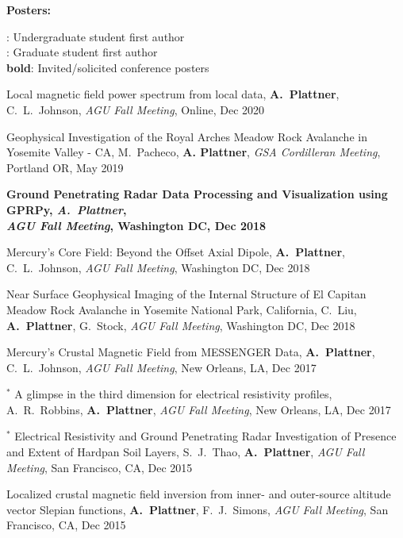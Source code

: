 \documentclass[10pt]{article}
\begin{document}



\spc
\textbf{\tsize Posters:}

\spcp
\ug: Undergraduate student first author\\
\gr: Graduate student first author\\
\textbf{bold}: Invited/solicited conference posters

\spcp
Local magnetic field power spectrum from local data,
\textbf{A.~Plattner}, C.~L.~Johnson, 
\emph{AGU Fall Meeting}, Online, Dec 2020 

\spcp
\hspace*{-0.4cm} \gr \hspace*{0.1cm} Geophysical Investigation of the Royal Arches Meadow Rock
Avalanche in Yosemite Valley - CA,
M.~Pacheco, \textbf{A. Plattner},
\emph{GSA Cordilleran Meeting}, Portland OR, May 2019

\spcp
\textbf{Ground Penetrating Radar Data Processing and Visualization using
GPRPy,
\emph{A.~Plattner},\\
\emph{AGU Fall Meeting}, Washington DC, Dec 2018}

\spcp
Mercury's Core Field: Beyond the Offset Axial Dipole,
\textbf{A.~Plattner}, C.~L.~Johnson, 
\emph{AGU Fall Meeting}, Washington DC, Dec 2018 

\spcp
\hspace*{-0.4cm} \gr \hspace*{-0.05cm} Near Surface Geophysical Imaging of the Internal
Structure of El Capitan Meadow Rock Avalanche in Yosemite National
Park, California,
C.~Liu, \textbf{A.~Plattner}, G.~Stock,
\emph{AGU Fall Meeting}, Washington DC, Dec 2018


\spcp
Mercury's Crustal Magnetic Field from MESSENGER Data,
 \textbf{A.~Plattner}, C.~L.~Johnson, 
\emph{AGU Fall Meeting}, New Orleans, LA, Dec 2017 

\spcp
\hspace{-0.4cm} $^*$ A glimpse in the third dimension for electrical
resistivity profiles,
A.~R.~Robbins, \textbf{A.~Plattner},
\emph{AGU Fall Meeting}, New Orleans, LA, Dec 2017 

\spcp
\hspace{-0.4cm} $^*$ Electrical Resistivity and Ground Penetrating Radar 
Investigation of Presence and Extent of Hardpan Soil Layers,
 S.~J.~Thao, \textbf{A.~Plattner},
\emph{AGU Fall Meeting}, San Francisco, CA, Dec 2015

\spcp
Localized crustal magnetic field inversion from inner- and outer-source altitude vector Slepian functions, \textbf{A.~Plattner},  F.~J.~Simons,
\emph{AGU Fall Meeting}, San Francisco, CA, Dec 2015
\end{document}
